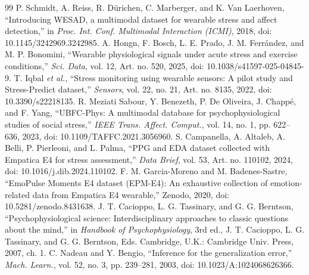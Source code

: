 \documentclass[journal]{IEEEtran}
\begin{document}
\begin{thebibliography}{99}
 P. Schmidt, A. Reiss, R. D\"urichen, C. Marberger, and K. Van Laerhoven, ``Introducing WESAD, a multimodal dataset for wearable stress and affect detection,'' in \emph{Proc. Int. Conf. Multimodal Interaction (ICMI)}, 2018, doi: 10.1145/3242969.3242985.
 A. Hongn, F. Bosch, L. E. Prado, J. M. Ferr\'andez, and M. P. Bonomini, ``Wearable physiological signals under acute stress and exercise conditions,'' \emph{Sci. Data}, vol. 12, Art. no. 520, 2025, doi: 10.1038/s41597-025-04845-9.
 T. Iqbal \emph{et al.}, ``Stress monitoring using wearable sensors: A pilot study and Stress-Predict dataset,'' \emph{Sensors}, vol. 22, no. 21, Art. no. 8135, 2022, doi: 10.3390/s22218135.
 R. Meziati Sabour, Y. Benezeth, P. De Oliveira, J. Chapp\'e, and F. Yang, ``UBFC-Phys: A multimodal database for psychophysiological studies of social stress,'' \emph{IEEE Trans. Affect. Comput.}, vol. 14, no. 1, pp. 622--636, 2023, doi: 10.1109/TAFFC.2021.3056960.
 S. Campanella, A. Altaleb, A. Belli, P. Pierleoni, and L. Palma, ``PPG and EDA dataset collected with Empatica E4 for stress assessment,'' \emph{Data Brief}, vol. 53, Art. no. 110102, 2024, doi: 10.1016/j.dib.2024.110102.
 F. M. Garcia-Moreno and M. Badenes-Sastre, ``EmoPulse Moments E4 dataset (EPM-E4): An exhaustive collection of emotion-related data from Empatica E4 wearable,'' Zenodo, 2020, doi: 10.5281/zenodo.8431638.
 J. T. Cacioppo, L. G. Tassinary, and G. G. Berntson, ``Psychophysiological science: Interdisciplinary approaches to classic questions about the mind,'' in \emph{Handbook of Psychophysiology}, 3rd ed., J. T. Cacioppo, L. G. Tassinary, and G. G. Berntson, Eds. Cambridge, U.K.: Cambridge Univ. Press, 2007, ch. 1.
 C. Nadeau and Y. Bengio, ``Inference for the generalization error,'' \emph{Mach. Learn.}, vol. 52, no. 3, pp. 239--281, 2003, doi: 10.1023/A:1024068626366.
\end{thebibliography}
\end{document}
